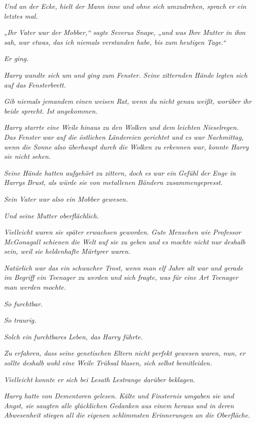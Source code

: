 {\emph{Und an der Ecke, hielt der Mann inne und ohne sich umzudrehen, sprach er ein letztes mal.}

\emph{„Ihr Vater war der Mobber,“ sagte Severus Snape, „und was Ihre Mutter in ihm sah, war etwas, das ich niemals verstanden habe, bis zum heutigen Tage.“}

\emph{Er ging.}

\emph{Harry wandte sich um und ging zum Fenster. Seine zitternden Hände legten sich auf das Fensterbrett.}

\emph{\emph{Gib niemals jemandem einen weisen Rat, wenn du nicht genau weißt, worüber ihr beide sprecht. Ist angekommen.}}

\emph{Harry starrte eine Weile hinaus zu den Wolken und dem leichten Nieselregen. Das Fenster war auf die östlichen Ländereien gerichtet und es war Nachmittag, wenn die Sonne also überhaupt durch die Wolken zu erkennen war, konnte Harry sie nicht sehen.}

\emph{Seine Hände hatten aufgehört zu zittern, doch es war ein Gefühl der Enge in Harrys Brust, als würde sie von metallenen Bändern zusammengepresst.}

\emph{Sein Vater war also ein Mobber gewesen.}

\emph{Und seine} \emph{Mutter oberflächlich.}

\emph{Vielleicht waren sie später erwachsen geworden. Gute Menschen wie Professor McGonagall schienen die Welt auf sie zu geben und es mochte nicht} \emph{\emph{nur}} \emph{deshalb sein, weil sie heldenhafte Märtyrer waren.}

\emph{Natürlich war das ein schwacher Trost, wenn man elf Jahre alt war und gerade im Begriff ein Teenager zu werden und sich fragte, was für eine Art Teenager man werden mochte.}

\emph{So furchtbar.}

\emph{So traurig.}

\emph{Solch ein furchtbares Leben, das Harry führte.}

\emph{Zu erfahren, dass seine genetischen Eltern nicht perfekt gewesen waren, nun, er sollte deshalb wohl eine Weile Trübsal blasen, sich selbst bemitleiden.}

\emph{Vielleicht konnte er sich bei Lesath Lestrange darüber beklagen.}

\emph{Harry hatte von Dementoren gelesen. Kälte und Finsternis umgaben sie und Angst, sie saugten alle glücklichen Gedanken aus einem heraus und in} \emph{deren} \emph{Abwesenheit stiegen all die eigenen schlimmsten Erinnerungen an die Oberfläche.}

}
